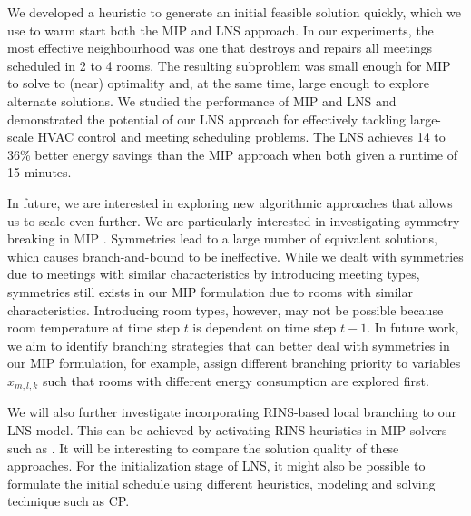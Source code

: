 We developed a heuristic to generate an initial feasible solution quickly, which we use to warm start both the MIP and LNS approach. In our experiments, the most effective neighbourhood was one that destroys and repairs all meetings scheduled in 2 to 4 rooms. The resulting subproblem was small enough for MIP to solve to (near) optimality and, at the same time, large enough to explore alternate solutions. We studied the performance of MIP and LNS and demonstrated the potential of our LNS approach for effectively tackling large-scale HVAC control and meeting scheduling problems. The LNS achieves 14 to 36\% better energy savings than the MIP approach when both given a runtime of 15 minutes. 

In future, we are interested in exploring new algorithmic approaches that allows us to scale even further. We are particularly interested in investigating symmetry breaking in MIP \citep{ostrowski2015modified}. Symmetries lead to a large number of equivalent solutions, which causes branch-and-bound to be ineffective. While we dealt with symmetries due to meetings with similar characteristics by introducing meeting types, symmetries still exists in our MIP formulation due to rooms with similar characteristics. Introducing room types, however, may not be possible because room temperature at time step $t$ is dependent on time step $t-1$. In future work, we aim to identify branching strategies that can better deal with symmetries in our MIP formulation, for example, assign different branching priority to variables $x_{m,l,k}$ such that rooms with different energy consumption are explored first. %

We will also further investigate incorporating RINS-based local branching to our LNS model. This can be achieved by activating RINS  heuristics in MIP solvers such as \cite{gurobi}. It will be interesting to compare the solution quality of these approaches.
For the initialization stage of LNS, it might also be possible to formulate the initial schedule using different heuristics, modeling and solving technique such as CP. 





